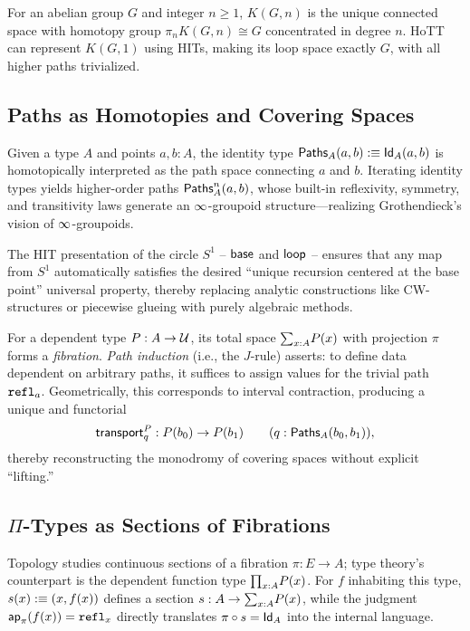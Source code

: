 \begin{definition}\label{def:EM}
  For an abelian group \(G\) and integer \(n\ge1\), \(K(G,n)\) is the unique connected space with homotopy group
  \(\pi_n K(G,n)\cong G\) concentrated in degree \(n\). HoTT can represent \(K(G,1)\) using HITs,
  making its loop space exactly \(G\), with all higher paths trivialized.
\end{definition}

\subsection{Paths as Homotopies and Covering Spaces}\label{sec:paths}
Given a type \(A\) and points \(a,b:A\), 
the identity type \(\textsf{Paths}_A(a,b):\equiv\textsf{Id}_A(a,b)\) is homotopically interpreted as the path space connecting \(a\) and \(b\).
Iterating identity types yields higher-order paths \(\textsf{Paths}^{n}_A(a,b)\), 
whose built-in reflexivity, symmetry, and transitivity laws generate an \(\infty\)-groupoid structure—realizing Grothendieck's vision of \(\infty\)-groupoids.

The HIT presentation of the circle \(S^1\) -- \(\textsf{base}\) and \(\textsf{loop}\) -- ensures that any map from \(S^1\) automatically satisfies the desired
``unique recursion centered at the base point'' universal property, thereby replacing analytic constructions like CW-structures or piecewise glueing with purely algebraic methods.

For a dependent type \(P:A\to\mathcal{U}\), its total space
\(\textstyle\mathbf{\sum}_{x:A}P(x)\) with projection
\(\pi\) forms a \emph{fibration}.
\emph{Path induction} (i.e., the \(J\)-rule) asserts: to define data dependent on arbitrary paths, it suffices to assign values for the trivial path
\(\texttt{refl}_a\). Geometrically, this corresponds to interval contraction, producing a unique and functorial
\[
  \textsf{transport}^{P}_{q}:P(b_0)\to P(b_1)\qquad(q:\textsf{Paths}_A(b_0,b_1)),
\]
thereby reconstructing the monodromy of covering spaces without explicit ``lifting.''

\subsection{\texorpdfstring{$\Pi$}{Π}-Types as Sections of Fibrations}\label{sec:fibrations}
Topology studies continuous sections of a fibration \(\pi:E\to A\); type theory's counterpart is the dependent function type
\(\textstyle\mathbf{\prod}_{x:A}P(x)\).
For \(f\) inhabiting this type,
\(s(x):\equiv(x,f(x))\) defines a section
\(s:A\to\textstyle\mathbf{\sum}_{x:A}P(x)\),
while the judgment
\(\mathsf{ap}_{\pi}(f(x))=\texttt{refl}_x\)
directly translates \(\pi\circ s=\textsf{Id}_A\) into the internal language.

